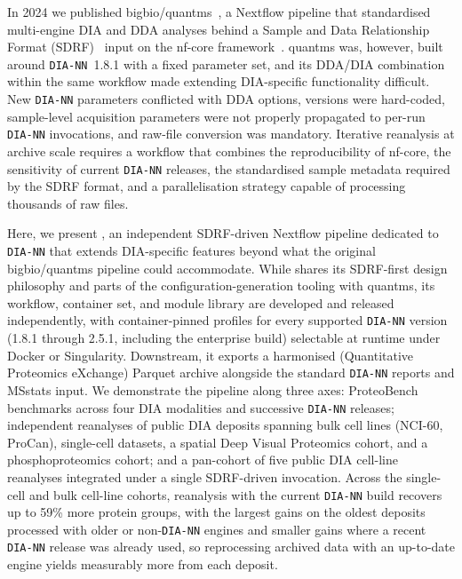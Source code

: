 \documentclass[preprint,12pt]{elsarticle}
\begin{document}
In 2024 we published bigbio/quantms~\cite{dai2024quantms}, a Nextflow pipeline that standardised multi-engine DIA and DDA analyses behind a Sample and Data Relationship Format (SDRF)~\cite{dai2021sdrf} input on the nf-core framework~\cite{ewels2020nfcore}. quantms was, however, built around \texttt{DIA-NN}~1.8.1 with a fixed parameter set, and its DDA/DIA combination within the same workflow made extending DIA-specific functionality difficult. New \texttt{DIA-NN} parameters conflicted with DDA options, versions were hard-coded, sample-level acquisition parameters were not properly propagated to per-run \texttt{DIA-NN} invocations, and raw-file conversion was mandatory. Iterative reanalysis at archive scale requires a workflow that combines the reproducibility of nf-core, the sensitivity of current \texttt{DIA-NN} releases, the standardised sample metadata required by the SDRF format, and a parallelisation strategy capable of processing thousands of raw files.

Here, we present \quantmsdiann{}, an independent SDRF-driven Nextflow pipeline dedicated to \texttt{DIA-NN} that extends DIA-specific features beyond what the original bigbio/quantms pipeline could accommodate. While \quantmsdiann{} shares its SDRF-first design philosophy and parts of the configuration-generation tooling with quantms, its workflow, container set, and module library are developed and released independently, with container-pinned profiles for every supported \texttt{DIA-NN} version (1.8.1 through 2.5.1, including the enterprise build) selectable at runtime under Docker or Singularity. Downstream, it exports a harmonised \qpx{} (Quantitative Proteomics eXchange) Parquet archive alongside the standard \texttt{DIA-NN} reports and MSstats input. We demonstrate the pipeline along three axes: ProteoBench~\cite{devreese2025proteobench} benchmarks across four DIA modalities and successive \texttt{DIA-NN} releases; independent reanalyses of public DIA deposits spanning bulk cell lines (NCI-60, ProCan), single-cell datasets, a spatial Deep Visual Proteomics cohort, and a phosphoproteomics cohort; and a pan-cohort of five public DIA cell-line reanalyses integrated under a single SDRF-driven invocation. Across the single-cell and bulk cell-line cohorts, reanalysis with the current \texttt{DIA-NN} build recovers up to 59\% more protein groups, with the largest gains on the oldest deposits processed with older or non-\texttt{DIA-NN} engines and smaller gains where a recent \texttt{DIA-NN} release was already used, so reprocessing archived data with an up-to-date engine yields measurably more from each deposit.
\end{document}
